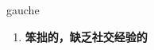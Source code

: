 
\begin{frame}
{\huge gauche}
\begin{center}
\begin{enumerate}\Large
  \item \textbf{笨拙的，缺乏社交经验的}
\end{enumerate}
\end{center}
\end{frame}
